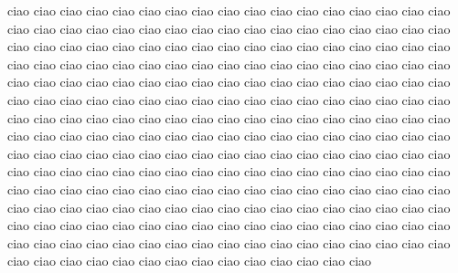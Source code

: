 ciao ciao ciao ciao ciao ciao ciao ciao ciao ciao ciao ciao ciao ciao ciao ciao ciao ciao ciao ciao ciao ciao ciao ciao ciao ciao ciao ciao 
ciao ciao ciao ciao ciao ciao ciao ciao ciao ciao ciao ciao ciao ciao ciao ciao ciao ciao ciao ciao ciao ciao ciao ciao ciao ciao ciao ciao 
ciao ciao ciao ciao ciao ciao ciao ciao ciao ciao ciao ciao ciao ciao ciao ciao ciao ciao ciao ciao ciao ciao ciao ciao ciao ciao ciao ciao 
ciao ciao ciao ciao ciao ciao ciao ciao ciao ciao ciao ciao ciao ciao ciao ciao ciao ciao ciao ciao ciao ciao ciao ciao ciao ciao ciao ciao 
ciao ciao ciao ciao ciao ciao ciao ciao ciao ciao ciao ciao ciao ciao ciao ciao ciao ciao ciao ciao ciao ciao ciao ciao ciao ciao ciao ciao 
ciao ciao ciao ciao ciao ciao ciao ciao ciao ciao ciao ciao ciao ciao ciao ciao ciao ciao ciao ciao ciao ciao ciao ciao ciao ciao ciao ciao 
ciao ciao ciao ciao ciao ciao ciao ciao ciao ciao ciao ciao ciao ciao ciao ciao ciao ciao ciao ciao ciao ciao ciao ciao ciao ciao ciao ciao 
ciao ciao ciao ciao ciao ciao ciao ciao ciao ciao ciao ciao ciao ciao ciao ciao ciao ciao ciao ciao ciao ciao ciao ciao ciao ciao ciao ciao 
ciao ciao ciao ciao ciao ciao ciao ciao ciao ciao ciao ciao ciao ciao ciao ciao ciao ciao ciao ciao ciao ciao ciao ciao ciao ciao ciao ciao 
